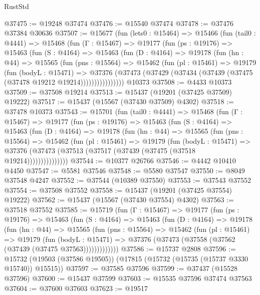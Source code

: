 \begin{lexlean}{RustStd}
\begin{coremodule}
@37475 := @19248 @37474
@37476 := @15540 @37474
@37478 := @37476 @37384 @30636
@37507 := @15677
    (fun (lets0 : @15464) =>
    @15466
      (fun (tail0 : @4441) =>
      @15468
        (fun (Γ : @15467) =>
        @19177
          (fun (ps : @19176) =>
          @15463
            (fun (S : @4164) =>
            @15463
              (fun (D : @4164) =>
              @19178
                (fun (hn : @44) =>
                @15565
                  (fun (pns : @15564) =>
                  @15462
                    (fun (pl : @15461) =>
                    @19179
                      (fun (bodyL : @15471) =>
                      @37376
                        (@37473
                          (@37429 (@37434 (@37439 (@37475 (@37478 @19212 @19214))))))))))))))))
    @10373
@37508 := @4433 @10373
@37509 := @37508 @19214
@37513 := @15437 (@19201 (@37425 @37509) @19222)
@37517 := @15437 (@15567 (@37430 @37509) @4302)
@37518 := @37478 @10373
@37543 := @15701
    (fun (tail0 : @4441) =>
    @15468
      (fun (Γ : @15467) =>
      @19177
        (fun (ps : @19176) =>
        @15463
          (fun (S : @4164) =>
          @15463
            (fun (D : @4164) =>
            @19178
              (fun (hn : @44) =>
              @15565
                (fun (pns : @15564) =>
                @15462
                  (fun (pl : @15461) =>
                  @19179
                    (fun (bodyL : @15471) =>
                    @37376 (@37473 (@37513 (@37517 (@37439 (@37475 (@37518 @19214)))))))))))))))
@37544 := @10377 @26766
@37546 := @4442 @10410 @4450
@37547 := @5581 @37546
@37548 := @5580 @37547
@37550 := @8049 @37548 @4247
@37552 := @37544 (@10389 @37550)
@37553 := @37543 @37552
@37554 := @37508 @37552
@37558 := @15437 (@19201 (@37425 @37554) @19222)
@37562 := @15437 (@15567 (@37430 @37554) @4302)
@37563 := @37518 @37552
@37585 := @15719
    (fun (Γ : @15467) =>
    @19177
      (fun (ps : @19176) =>
      @15463
        (fun (S : @4164) =>
        @15463
          (fun (D : @4164) =>
          @19178
            (fun (hn : @44) =>
            @15565
              (fun (pns : @15564) =>
              @15462
                (fun (pl : @15461) =>
                @19179
                  (fun (bodyL : @15471) =>
                  @37376 (@37473 (@37558 (@37562 (@37439 (@37475 @37563)))))))))))))
@37586 := @15737 @2808
@37596 := @15732 (@19503 (@37586 @19505)) (@17815 (@15732 (@15735 (@15737 @3330 @15740)) @15515))
@37597 := @37585 @37596
@37599 := @37437 (@15528 @37596)
@37600 := @15437 @37599
@37603 := @15535 @37596 @37474 @37563
@37604 := @37600 @37603
@37623 := @19517

\end{coremodule}
\end{lexlean}
